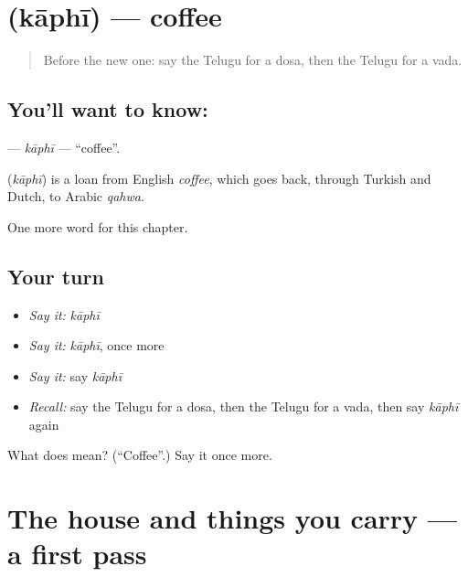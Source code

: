 \section[\texorpdfstring{\te{కాఫీ} (kāphī)}{కాఫీ (kāphī)}]{ (kāphī) — coffee}

\label{lesson:TE-C119-kaphi}



\begin{quote}
Before the new one: say the Telugu for a dosa, then the Telugu for a vada.
\end{quote}

\subsection*{You'll want to know: }
\textbf{} — \emph{kāphī} — \textquotedblleft{}coffee\textquotedblright{}.

\begin{cousinweb}
\textbf{} (\emph{kāphī}) is a loan from English \emph{coffee}, which goes back, through Turkish and Dutch, to Arabic \emph{qahwa}.
\end{cousinweb}

\begin{grammarlens}[title={What you've built}]
One more word for this chapter.
\end{grammarlens}

\subsection*{Your turn}
\begin{itemize}
\raggedright
  \item \emph{Say it:} \emph{kāphī}
  \item \emph{Say it:} \emph{kāphī}, once more
  \item \emph{Say it:} say \emph{kāphī}
  \item \emph{Recall:} say the Telugu for a dosa, then the Telugu for a vada, then say \emph{kāphī} again
\end{itemize}

\begin{tcolorbox}[breakable,colback=teal!4,colframe=teal!35!black,title={Before you move on}]
What does  mean? (\textquotedblleft{}Coffee\textquotedblright{}.) Say it once more.
\end{tcolorbox}
\section[(dialogue)]{The house and things you carry — a first pass}

